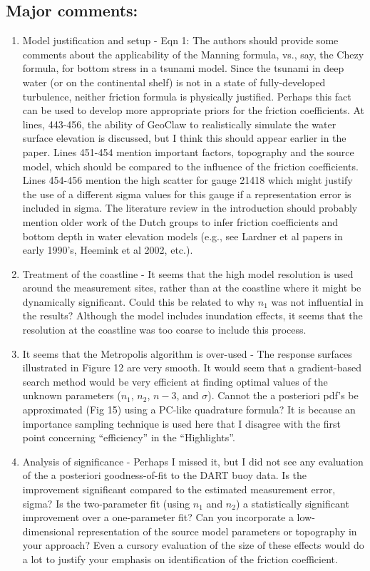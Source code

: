 \documentclass[]{article}
\begin{document}
\subsection*{Major comments:}
\begin{enumerate}
\item Model justification and setup - Eqn 1: The authors should provide some comments about the applicability of the Manning formula, vs., say, the Chezy formula, for bottom stress in a tsunami model. Since the tsunami in deep water (or on the continental shelf) is not in a state of fully-developed turbulence, neither friction formula is physically justified. Perhaps this fact can be used to develop more appropriate priors for the friction coefficients. At lines, 443-456, the ability of GeoClaw to realistically simulate the water surface elevation is discussed, but I think this should appear earlier in the paper. Lines 451-454 mention important factors, topography and the source model, which should be compared to the influence of the friction coefficients. Lines 454-456 mention the high scatter for gauge 21418 which might justify the use of a different sigma values for this gauge if a representation error is included in sigma. The literature review in the introduction should probably mention older work of the
Dutch groups to infer friction coefficients and bottom depth in water elevation models (e.g., see Lardner et al papers in early 1990's, Heemink et al 2002, etc.).

\item Treatment of the coastline - It seems that the high model resolution is used around the measurement sites, rather than at the coastline where it might be dynamically significant. Could this be related to why $n_1$ was not influential in the results? Although the model includes inundation effects, it seems that the resolution at the coastline was too coarse to include this process.

\item It seems that the Metropolis algorithm is over-used - The response surfaces illustrated in Figure 12 are very smooth. It would seem that a gradient-based search method would be very efficient at finding optimal values of the unknown parameters ($n_1$, $n_2$, $n-3$, and $\sigma$). Cannot the a posteriori pdf's be approximated (Fig 15) using a PC-like quadrature formula? It is because an importance sampling technique is used here that I disagree with the first point concerning ``efficiency'' in the ``Highlights''.

\item Analysis of significance - Perhaps I missed it, but I did not see any evaluation of the a posteriori goodness-of-fit to the DART buoy data. Is the improvement significant compared to the estimated measurement error, sigma? Is the two-parameter fit (using $n_1$ and $n_2$) a statistically significant improvement over a one-parameter fit? Can you incorporate a low-dimensional representation of the source model parameters or topography in your approach? Even a cursory evaluation of the size of these effects would do a lot to justify your emphasis on identification of the friction coefficient.
\end{enumerate}
\end{document}
